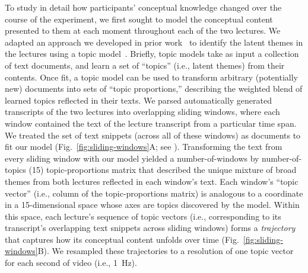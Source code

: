 \documentclass[10pt]{article}
\renewcommand{\nameref}[1]{\mbox{\textit{\oldnameref{#1}}}}
\begin{document}
To study in detail how participants' conceptual knowledge changed over the
course of the experiment, we first sought to model the conceptual content
presented to them at each moment throughout each of the two lectures. We
adapted an approach we developed in prior work~\citep{HeusEtal21} to identify
the latent themes in the lectures using a topic model~\citep{BleiEtal03}.
Briefly, topic models take as input a collection of text documents, and learn a
set of ``topics'' (i.e., latent themes) from their contents. Once fit, a topic
model can be used to transform arbitrary (potentially new) documents into sets
of ``topic proportions,'' describing the weighted blend of learned topics
reflected in their texts. We parsed automatically generated transcripts of the
two lectures into overlapping sliding windows, where each window contained the
text of the lecture transcript from a particular time span. We treated the set
of text snippets (across all of these windows) as documents to fit our model
(Fig.~\ref{fig:sliding-windows}A; see \nameref{subsec:topic-modeling}).
Transforming the text from every sliding window with our model yielded a
number-of-windows by number-of-topics (15) topic-proportions matrix that
described the unique mixture of broad themes from both lectures reflected in
each window's text. Each window's ``topic vector'' (i.e., column of the
topic-proportions matrix) is analogous to a coordinate in a 15-dimensional space whose axes
are topics discovered by the model. Within this space, each lecture's sequence
of topic vectors (i.e., corresponding to its transcript's overlapping text
snippets across sliding windows) forms a \textit{trajectory} that captures how
its conceptual content unfolds over time (Fig.~\ref{fig:sliding-windows}B). We
resampled these trajectories to a resolution of one topic vector for each
second of video (i.e., 1~Hz).
\end{document}
